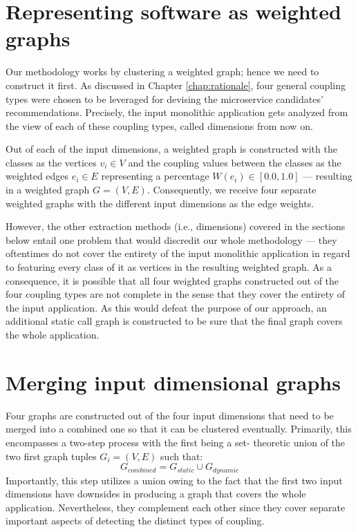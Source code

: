 \documentclass[12pt,a4paper]{report}
\begin{document}
\section{Representing software as weighted graphs} \label{sect:software-as-weighted-graph}

Our methodology works by clustering a weighted graph; hence we need to
construct it first. As discussed in Chapter \ref{chap:rationale}, four general
coupling types were chosen to be leveraged for devising the microservice
candidates' recommendations. Precisely, the input monolithic application gets
analyzed from the view of each of these coupling types, called dimensions from
now on.

Out of each of the input dimensions, a weighted graph is constructed with the
classes as the vertices \(v_i \in V\) and the coupling values between the
classes as the weighted edges \(e_i \in E\) representing a percentage \(W(e_i)
\in [0.0, 1.0]\) --- resulting in a weighted graph \(G = (V, E)\).
Consequently, we receive four separate weighted graphs with the different
input dimensions as the edge weights.

However, the other extraction methods (i.e., dimensions) covered in the
sections below entail one problem that would discredit our whole
methodology --- they oftentimes do not cover the entirety of the input
monolithic application in regard to featuring every class of it as vertices in
the resulting weighted graph. As a consequence, it is possible that all four
weighted graphs constructed out of the four coupling types are not complete in
the sense that they cover the entirety of the input application. As this would
defeat the purpose of our approach, an additional static call graph is
constructed to be sure that the final graph covers the whole application.



\section{Merging input dimensional graphs} \label{sect:merging-graphs}

Four graphs are constructed out of the four input dimensions that need
to be merged into a combined one so that it can be clustered eventually.
Primarily, this encompasses a two-step process with the first being a set\hyp
theoretic union of the two first graph tuples \(G_i = (V, E)\) such that:
\[
  G_{combined} = G_{static} \cup G_{dynamic}
\]
Importantly, this step utilizes a
union owing to the fact that the first two input dimensions have downsides in
producing a graph that covers the whole application. Nevertheless, they
complement each other since they cover separate important aspects of detecting
the distinct types of coupling.
\end{document}

